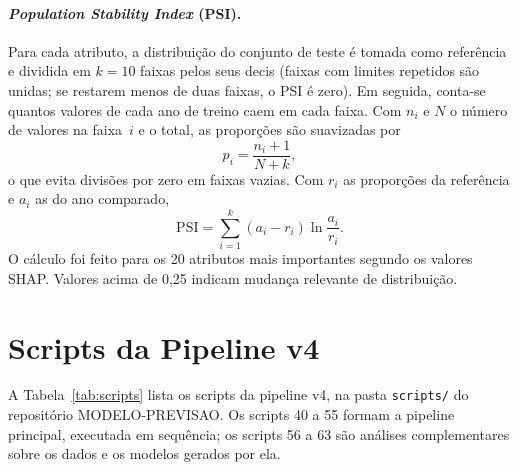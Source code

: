 \begin{apendicesenv}
\paragraph{\textit{Population Stability Index} (PSI).} Para cada atributo, a distribuição do conjunto de teste é tomada como referência e dividida em $k=10$ faixas pelos seus decis (faixas com limites repetidos são unidas; se restarem menos de duas faixas, o PSI é zero). Em seguida, conta-se quantos valores de cada ano de treino caem em cada faixa. Com $n_i$ e $N$ o número de valores na faixa~$i$ e o total, as proporções são suavizadas por
\begin{equation}
p_i = \frac{n_i + 1}{N + k},
\end{equation}
o que evita divisões por zero em faixas vazias. Com $r_i$ as proporções da referência e $a_i$ as do ano comparado,
\begin{equation}
\mathrm{PSI} = \sum_{i=1}^{k} (a_i - r_i) \ln\frac{a_i}{r_i}.
\end{equation}
O cálculo foi feito para os 20 atributos mais importantes segundo os valores SHAP. Valores acima de 0,25 indicam mudança relevante de distribuição.

\section{Scripts da Pipeline v4}
\label{ap:scripts}

A Tabela~\ref{tab:scripts} lista os scripts da pipeline v4, na pasta \texttt{scripts/} do repositório MODELO-PREVISAO. Os scripts 40 a 55 formam a pipeline principal, executada em sequência; os scripts 56 a 63 são análises complementares sobre os dados e os modelos gerados por ela.


\end{apendicesenv}
